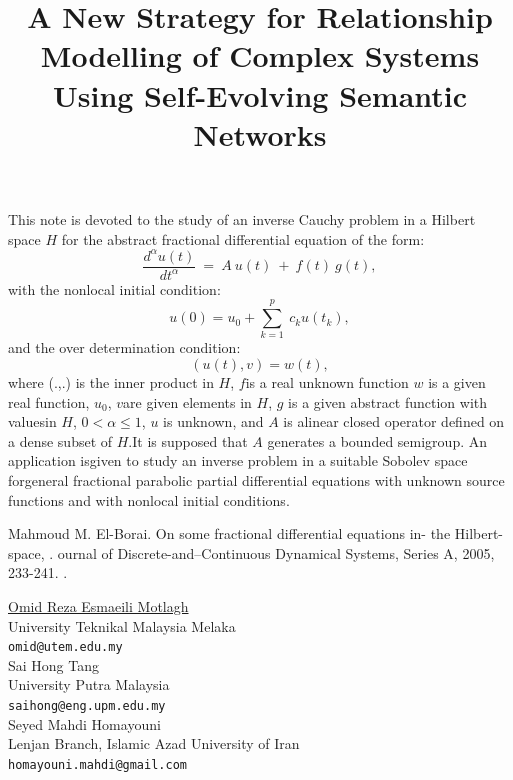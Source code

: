 \documentclass[article, A4, 11pt]{llncs}%
\begin{document}
This note is devoted to the study of an inverse Cauchy problem in a Hilbert space $H$ for the abstract fractional differential equation of the form:  $$\frac{d^{\alpha}u(t)}{dt^\alpha}~=~A~u(t)~+~f(t)~g(t),$$with the nonlocal initial condition:$$u(0) = u_0 + \sum_{k=1}^p~c_k u(t_k),$$and the over determination condition:$$(u(t), v) = w (t),$$where (.,.) is the inner product in $H$, $f$is a real unknown function $w$ is a given real function, $u_0$, $v$are given elements in $H$, $g$ is a given abstract function with valuesin $H$, $0 < \alpha \leq 1 $, $u$ is unknown, and $A$ is alinear closed operator defined on a dense subset of $H$.It is supposed that $A$ generates a bounded semigroup. An application isgiven to study an inverse problem in a suitable Sobolev space forgeneral fractional parabolic partial differential equations with  unknown source functions and with nonlocal initial conditions.



\begin{thebibliography}{10}
{\sc Mahmoud M. El-Borai}. {On some fractional differential  equations in- the Hilbert-space, }. ournal of Discrete-and--Continuous Dynamical Systems, Series A, 2005, 233-241. .
\end{thebibliography} %

\title{A New Strategy for Relationship Modelling of Complex Systems Using Self-Evolving Semantic Networks}
 \author{} \institute{}
\maketitle
\begin{center}
{\large \underline{Omid Reza Esmaeili Motlagh}}\\
University Teknikal Malaysia Melaka\\
{\tt omid@utem.edu.my}
\\ \vspace{4mm}
{\large Sai Hong Tang}\\
University Putra Malaysia\\
{\tt saihong@eng.upm.edu.my}
\\ \vspace{4mm}
{\large Seyed Mahdi  Homayouni}\\
Lenjan Branch,  Islamic Azad University of Iran\\
{\tt homayouni.mahdi@gmail.com}
\end{center}
\end{document}
